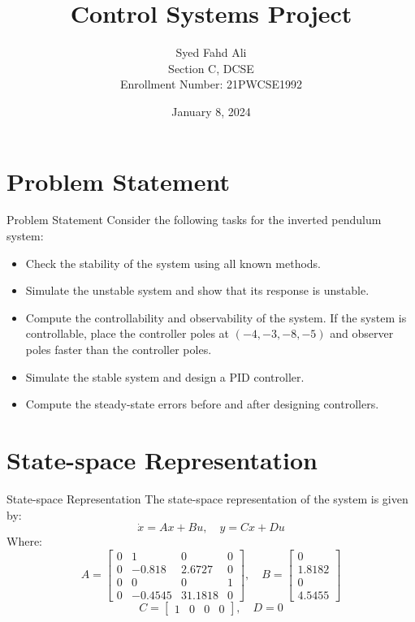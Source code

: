 \documentclass[10pt,compress,mathserif]{beamer}
\title[]{Control Systems Project}
\author[]{Syed Fahd Ali\\ Section C, DCSE\\ Enrollment Number: 21PWCSE1992}
\date{January 8, 2024}
\begin{document}
\begin{frame}    \titlepage \end{frame}

\section{Problem Statement}
\begin{frame}{Problem Statement}
Consider the following tasks for the inverted pendulum system:
\begin{itemize}
    \item Check the stability of the system using all known methods.
    \item Simulate the unstable system and show that its response is unstable.
    \item Compute the controllability and observability of the system. If the system is controllable, place the controller poles at \((-4, -3, -8, -5)\) and observer poles faster than the controller poles.
    \item Simulate the stable system and design a PID controller.
    \item Compute the steady-state errors before and after designing controllers.
\end{itemize}
\end{frame}

\section{State-space Representation}
\begin{frame}{State-space Representation}
The state-space representation of the system is given by:
\[ \dot{x} = Ax + Bu, \quad y = Cx + Du \]
Where:
\[
A = \begin{bmatrix}
0 & 1 & 0 & 0 \\
0 & -0.818 & 2.6727 & 0 \\
0 & 0 & 0 & 1 \\
0 & -0.4545 & 31.1818 & 0
\end{bmatrix}, \quad
B = \begin{bmatrix} 0 \\ 1.8182 \\ 0 \\ 4.5455 \end{bmatrix}
\]
\[
C = \begin{bmatrix} 1 & 0 & 0 & 0 \end{bmatrix}, \quad D = 0
\]
\end{frame}
\end{document}
